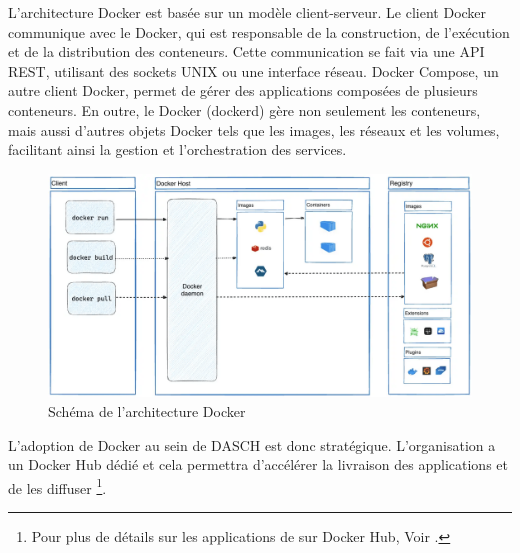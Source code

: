         L'architecture Docker est basée sur un modèle client-serveur. Le client Docker communique avec le  Docker, qui est responsable de la construction, de l'exécution et de la distribution des conteneurs. Cette communication se fait via une API REST, utilisant des sockets UNIX ou une interface réseau. Docker Compose, un autre client Docker, permet de gérer des applications composées de plusieurs conteneurs. En outre, le  Docker (dockerd) gère non seulement les conteneurs, mais aussi d'autres objets Docker tels que les images, les réseaux et les volumes, facilitant ainsi la gestion et l'orchestration des services.

        \begin{figure}[h!]
            \centering
            \includegraphics[width=12cm]{02_images/part_01/10_docker_architecture.png}
            \caption{Schéma de l'architecture Docker}
        \end{figure}

        L'adoption de Docker au sein de DASCH est donc stratégique. L'organisation a un Docker Hub dédié et cela permettra d'accélérer la livraison des applications et de les diffuser \footnote{Pour plus de détails sur les applications de \dsc sur Docker Hub, Voir \cite{daschswiss_dockerhub}.}.
        